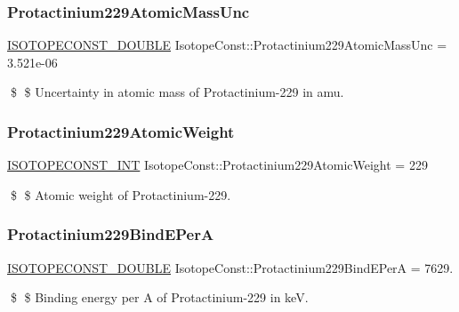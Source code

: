\subsubsection{\texorpdfstring{Protactinium229\+Atomic\+Mass\+Unc}{Protactinium229AtomicMassUnc}}
{\footnotesize\ttfamily \mbox{\hyperlink{group___isotope_const-_macros_ga8f45a7272ce02c0b4c65c44636ed719a}{I\+S\+O\+T\+O\+P\+E\+C\+O\+N\+S\+T\+\_\+\+D\+O\+U\+B\+LE}} Isotope\+Const\+::\+Protactinium229\+Atomic\+Mass\+Unc = 3.\+521e-\/06}

\$ \$ Uncertainty in atomic mass of Protactinium-\/229 in amu. \mbox{\label{group___isotope_const-_protactinium-_pa229_ga9f49df622f433f361b9879e148a4362f}} 
\subsubsection{\texorpdfstring{Protactinium229\+Atomic\+Weight}{Protactinium229AtomicWeight}}
{\footnotesize\ttfamily \mbox{\hyperlink{group___isotope_const-_macros_ga5f18360b3e99483a35c32d789e62621c}{I\+S\+O\+T\+O\+P\+E\+C\+O\+N\+S\+T\+\_\+\+I\+NT}} Isotope\+Const\+::\+Protactinium229\+Atomic\+Weight = 229}

\$ \$ Atomic weight of Protactinium-\/229. \mbox{\label{group___isotope_const-_protactinium-_pa229_ga4e56fa4eb7d2c1ec48178d62d9fad1b7}} 
\subsubsection{\texorpdfstring{Protactinium229\+Bind\+E\+PerA}{Protactinium229BindEPerA}}
{\footnotesize\ttfamily \mbox{\hyperlink{group___isotope_const-_macros_ga8f45a7272ce02c0b4c65c44636ed719a}{I\+S\+O\+T\+O\+P\+E\+C\+O\+N\+S\+T\+\_\+\+D\+O\+U\+B\+LE}} Isotope\+Const\+::\+Protactinium229\+Bind\+E\+PerA = 7629.}

\$ \$ Binding energy per A of Protactinium-\/229 in keV. \mbox{\label{group___isotope_const-_protactinium-_pa229_ga58b335a0c2779bfabfff93c8d650b944}} 
